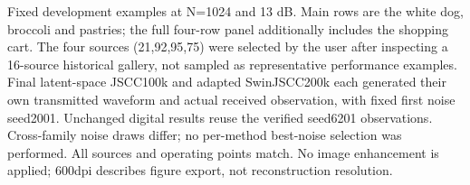 Fixed development examples at N=1024 and 13 dB. Main rows are the white dog, broccoli and pastries; the full four-row panel additionally includes the shopping cart. The four sources (21,92,95,75) were selected by the user after inspecting a 16-source historical gallery, not sampled as representative performance examples. Final latent-space JSCC100k and adapted SwinJSCC200k each generated their own transmitted waveform and actual received observation, with fixed first noise seed2001. Unchanged digital results reuse the verified seed6201 observations. Cross-family noise draws differ; no per-method best-noise selection was performed. All sources and operating points match. No image enhancement is applied; 600dpi describes figure export, not reconstruction resolution.
